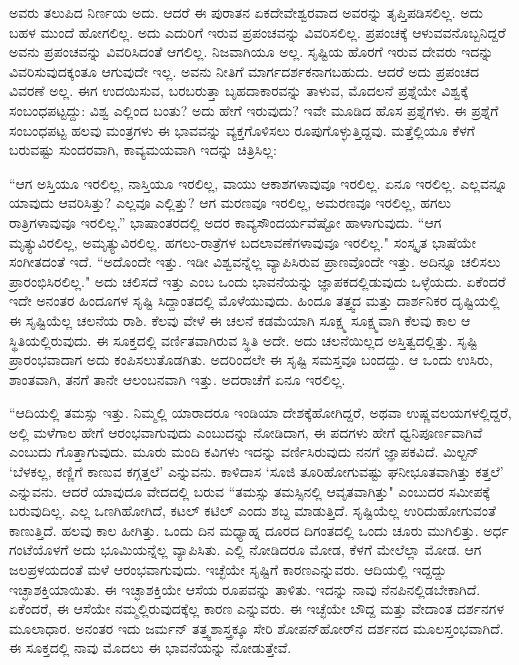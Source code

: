 ಅವರು ತಲುಪಿದ ನಿರ್ಣಯ ಅದು. ಆದರೆ ಈ ಪುರಾತನ ಏಕದೇವೇಶ್ವರವಾದ ಅವರನ್ನು ತೃಪ್ತಿಪಡಿಸಲಿಲ್ಲ. ಅದು ಬಹಳ ಮುಂದೆ ಹೋಗಲಿಲ್ಲ. ಅದು ಎದುರಿಗೆ ಇರುವ ಪ್ರಪಂಚವನ್ನು ವಿವರಿಸಲಿಲ್ಲ. ಪ್ರಪಂಚಕ್ಕೆ ಆಳುವವನೊಬ್ಬನಿದ್ದರೆ ಅವನು ಪ್ರಪಂಚವನ್ನು ವಿವರಿಸಿದಂತೆ ಆಗಲಿಲ್ಲ. ನಿಜವಾಗಿಯೂ ಅಲ್ಲ. ಸೃಷ್ಟಿಯ ಹೊರಗೆ ಇರುವ ದೇವರು ಇದನ್ನು ವಿವರಿಸುವುದಕ್ಕಂತೂ ಆಗುವುದೇ ಇಲ್ಲ. ಅವನು ನೀತಿಗೆ ಮಾರ್ಗದರ್ಶಕನಾಗಬಹುದು. ಆದರೆ ಅದು ಪ್ರಪಂಚದ ವಿವರಣೆ ಅಲ್ಲ. ಈಗ ಉದಯಿಸುವ, ಬರಬರುತ್ತಾ ಬೃಹದಾಕಾರವನ್ನು ತಾಳುವ, ಮೊದಲನೆ ಪ್ರಶ್ನೆಯೇ ವಿಶ್ವಕ್ಕೆ ಸಂಬಂಧಪಟ್ಟದ್ದು: ವಿಶ್ವ ಎಲ್ಲಿಂದ ಬಂತು? ಅದು ಹೇಗೆ ಇರುವುದು? ಇವೇ ಮೂಡಿದ ಹೊಸ ಪ್ರಶ್ನೆಗಳು. ಈ ಪ್ರಶ್ನೆಗೆ ಸಂಬಂಧಪಟ್ಟ ಹಲವು ಮಂತ್ರಗಳು ಈ ಭಾವವನ್ನು ವ್ಯಕ್ತಗೊಳಿಸಲು ರೂಪುಗೊಳ್ಳುತ್ತಿದ್ದವು. ಮತ್ತೆಲ್ಲಿಯೂ ಕೆಳಗೆ ಬರುವಷ್ಟು ಸುಂದರವಾಗಿ, ಕಾವ್ಯಮಯವಾಗಿ ಇದನ್ನು ಚಿತ್ರಿಸಿಲ್ಲ:

“ಆಗ ಅಸ್ತಿಯೂ ಇರಲಿಲ್ಲ, ನಾಸ್ತಿಯೂ ಇರಲಿಲ್ಲ, ವಾಯು ಆಕಾಶಗಳಾವುವೂ ಇರಲಿಲ್ಲ. ಏನೂ ಇರಲಿಲ್ಲ. ಎಲ್ಲವನ್ನೂ ಯಾವುದು ಆವರಿಸಿತ್ತು? ಎಲ್ಲವೂ ಎಲ್ಲಿತ್ತು? ಆಗ ಮರಣವೂ ಇರಲಿಲ್ಲ, ಅಮರಣವೂ ಇರಲಿಲ್ಲ, ಹಗಲು ರಾತ್ರಿಗಳಾವುವೂ ಇರಲಿಲ್ಲ.” ಭಾಷಾಂತರದಲ್ಲಿ ಅದರ ಕಾವ್ಯಸೌಂದರ್ಯವೆಷ್ಟೋ ಹಾಳಾಗುವುದು. “ಆಗ ಮೃತ್ಯುವಿರಲಿಲ್ಲ, ಅಮೃತ್ಯುವಿರಲಿಲ್ಲ. ಹಗಲು-ರಾತ್ರೆಗಳ ಬದಲಾವಣೆಗಳಾವುವೂ ಇರಲಿಲ್ಲ." ಸಂಸ್ಕೃತ ಭಾಷೆಯೇ ಸಂಗೀತದಂತೆ ಇದೆ. “ಅದೊಂದೇ ಇತ್ತು. ಇಡೀ ವಿಶ್ವವನ್ನೆಲ್ಲ ವ್ಯಾಪಿಸಿರುವ ಪ್ರಾಣವೊಂದೇ ಇತ್ತು. ಅದಿನ್ನೂ ಚಲಿಸಲು ಪ್ರಾರಂಭಿಸಿರಲಿಲ್ಲ." ಅದು ಚಲಿಸದೆ ಇತ್ತು ಎಂಬ ಒಂದು ಭಾವನೆಯನ್ನು ಜ್ಞಾಪಕದಲ್ಲಿಡುವುದು ಒಳ್ಳೆಯದು. ಏಕೆಂದರೆ ಇದೇ ಅನಂತರ ಹಿಂದೂಗಳ ಸೃಷ್ಟಿ ಸಿದ್ದಾಂತದಲ್ಲಿ ಮೊಳೆಯುವುದು. ಹಿಂದೂ ತತ್ತ್ವದ ಮತ್ತು ದಾರ್ಶನಿಕರ ದೃಷ್ಟಿಯಲ್ಲಿ ಈ ಸೃಷ್ಟಿಯೆಲ್ಲ ಚಲನೆಯ ರಾಶಿ. ಕೆಲವು ವೇಳೆ ಈ ಚಲನೆ ಕಡಮೆಯಾಗಿ ಸೂಕ್ಷ್ಮ ಸೂಕ್ಷ್ಮವಾಗಿ ಕೆಲವು ಕಾಲ ಆ ಸ್ಥಿತಿಯಲ್ಲಿರುವುದು. ಈ ಸೂಕ್ತದಲ್ಲಿ ವರ್ಣಿತವಾಗಿರುವ ಸ್ಥಿತಿ ಅದೇ. ಅದು ಚಲನೆಯಿಲ್ಲದ ಅಸ್ತಿತ್ವದಲ್ಲಿತ್ತು. ಸೃಷ್ಟಿ ಪ್ರಾರಂಭವಾದಾಗ ಅದು ಕಂಪಿಸಲುತೊಡಗಿತು. ಅದರಿಂದಲೇ ಈ ಸೃಷ್ಟಿ ಸಮಸ್ತವೂ ಬಂದದ್ದು. ಆ ಒಂದು ಉಸಿರು, ಶಾಂತವಾಗಿ, ತನಗೆ ತಾನೇ ಆಲಂಬನವಾಗಿ ಇತ್ತು. ಅದರಾಚೆಗೆ ಏನೂ ಇರಲಿಲ್ಲ.

“ಆದಿಯಲ್ಲಿ ತಮಸ್ಸು ಇತ್ತು. ನಿಮ್ಮಲ್ಲಿ ಯಾರಾದರೂ ಇಂಡಿಯಾ ದೇಶಕ್ಕೆ\break ಹೋಗಿದ್ದರೆ, ಅಥವಾ ಉಷ್ಣವಲಯಗಳಲ್ಲಿದ್ದರೆ, ಅಲ್ಲಿ ಮಳೆಗಾಲ ಹೇಗೆ ಆರಂಭವಾಗುವುದು ಎಂಬುದನ್ನು ನೋಡಿದಾಗ, ಈ ಪದಗಳು ಹೇಗೆ ಧ್ವನಿಪೂರ್ಣವಾಗಿವೆ ಎಂಬುದು ಗೊತ್ತಾಗುವುದು. ಮೂರು ಮಂದಿ ಕವಿಗಳು ಇದನ್ನು ವರ್ಣಿಸಿರುವುದು ನನಗೆ ಜ್ಞಾಪಕವಿದೆ. ಮಿಲ್ಟನ್  `ಬೆಳಕಲ್ಲ, ಕಣ್ಣಿಗೆ ಕಾಣುವ ಕಗ್ಗತ್ತಲೆ' ಎನ್ನುವನು. ಕಾಳಿದಾಸ `ಸೂಜಿ ತೂರಿಹೋಗುವಷ್ಟು ಘನೀಭೂತವಾಗಿತ್ತು ಕತ್ತಲೆ' ಎನ್ನುವನು. ಆದರೆ ಯಾವುದೂ ವೇದದಲ್ಲಿ ಬರುವ “ತಮಸ್ಸು ತಮಸ್ಸಿನಲ್ಲಿ ಆವೃತವಾಗಿತ್ತು" ಎಂಬುದರ ಸಮೀಪಕ್ಕೆ ಬರುವುದಿಲ್ಲ. ಎಲ್ಲ ಒಣಗಿಹೋಗಿದೆ, ಕಟಲ್ ಕಟಿಲ್ ಎಂದು ಶಬ್ದ ಮಾಡುತ್ತಿದೆ. ಸೃಷ್ಟಿಯೆಲ್ಲ ಉರಿದುಹೋಗುವಂತೆ ಕಾಣುತ್ತಿದೆ. ಹಲವು ಕಾಲ ಹೀಗಿತ್ತು. ಒಂದು ದಿನ ಮಧ್ಯಾಹ್ನ ದೂರದ ದಿಗಂತದಲ್ಲಿ ಒಂದು ಚೂರು ಮುಗಿಲಿತ್ತು. ಅರ್ಧ ಗಂಟೆಯೊಳಗೆ ಅದು ಭೂಮಿಯನ್ನೆಲ್ಲ ವ್ಯಾಪಿಸಿತು. ಎಲ್ಲಿ ನೋಡಿದರೂ ಮೋಡ, ಕೆಳಗೆ ಮೇಲೆಲ್ಲಾ ಮೋಡ. ಆಗ ಜಲಪ್ರಳಯದಂತೆ ಮಳೆ ಆರಂಭವಾಗುವುದು. ಇಚ್ಛೆಯೇ ಸೃಷ್ಟಿಗೆ ಕಾರಣ\break ಎನ್ನುವರು. ಆದಿಯಲ್ಲಿ ಇದ್ದದ್ದು ಇಚ್ಛಾಶಕ್ತಿಯಾಯಿತು. ಈ ಇಚ್ಛಾಶಕ್ತಿಯೇ ಆಸೆಯ ರೂಪವನ್ನು ತಾಳಿತು. ಇದನ್ನು ನಾವು ನೆನಪಿನಲ್ಲಿಡಬೇಕಾಗಿದೆ. ಏಕೆಂದರೆ, ಈ ಆಸೆಯೇ ನಮ್ಮಲ್ಲಿರುವುದಕ್ಕೆಲ್ಲ ಕಾರಣ ಎನ್ನುವರು. ಈ ಇಚ್ಛೆಯೇ ಬೌದ್ದ ಮತ್ತು ವೇದಾಂತ ದರ್ಶನಗಳ ಮೂಲಾಧಾರ. ಅನಂತರ ಇದು ಜರ್ಮನ್ ತತ್ತ್ವಶಾಸ್ತ್ರಕ್ಕೂ ಸೇರಿ ಶೋಪನ್‌ಹೋರ್‌ನ ದರ್ಶನದ ಮೂಲಸ್ತಂಭವಾಗಿದೆ. ಈ ಸೂಕ್ತದಲ್ಲಿ ನಾವು ಮೊದಲು ಈ ಭಾವನೆಯನ್ನು ನೋಡುತ್ತೇವೆ.

